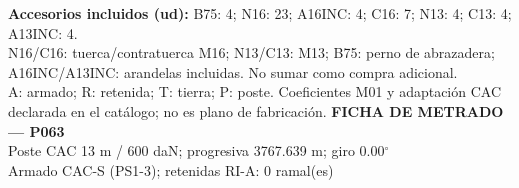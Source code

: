 \begingroup\scriptsize
\textbf{Accesorios incluidos (ud):} B75: 4; N16: 23; A16INC: 4; C16: 7; N13: 4; C13: 4; A13INC: 4.\\
N16/C16: tuerca/contratuerca M16; N13/C13: M13; B75: perno de abrazadera; A16INC/A13INC: arandelas incluidas. No sumar como compra adicional.\\
A: armado; R: retenida; T: tierra; P: poste. Coeficientes M01 y adaptación CAC declarada en el catálogo; no es plano de fabricación.
\endgroup\endgroup
\clearpage{}
\begingroup\small\setlength{\parskip}{3pt}\renewcommand{\arraystretch}{1.05}
\textbf{\large FICHA DE METRADO — P063}\\[4pt]
Poste CAC 13 m / 600 daN; progresiva 3767.639 m; giro 0.00\ensuremath{^\circ}\\
Armado CAC-S (PS1-3); retenidas RI-A: 0 ramal(es)\\
\begingroup\scriptsize
